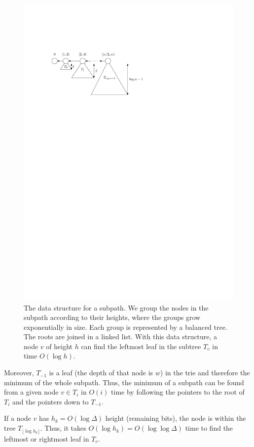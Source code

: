 \documentclass[a4paper,11pt]{article}
\newcommand{\?}{\mskip1.5mu}
\begin{document}
\begin{figure}
\centering
\includegraphics{queryds}
\caption{The data structure for a subpath. We group the nodes
in the subpath according to their heights, where the groups
grow exponentially in size. Each group is represented by a
balanced tree. The roots are joined in a linked
list. With this data structure, a node $v$ of height $h$ can
find the leftmost leaf in the subtree $T_v$ in time $O(\log h)$.}
\label{fig:queryds}
\end{figure}


Moreover, $T_{-1}$ is a leaf (the depth of that node is $w$) 
in the trie and therefore the minimum of the whole subpath. Thus, 
the minimum of a subpath can be found from a given node 
$v \in T_i$ in $O(i)$ time by following the
pointers to the root of $T_i$ and the pointers down to $T_{-1}$.

If a node $v$ has $h_k = O(\log \Delta)$ height (remaining bits), 
the node is within
the tree $T_{\lfloor \log h_k \rfloor}$. Thus, it takes 
$O(\log h_k) = O(\log\log\Delta)$ time to find the leftmost
or rightmost leaf in $T_v$.
\end{document}
